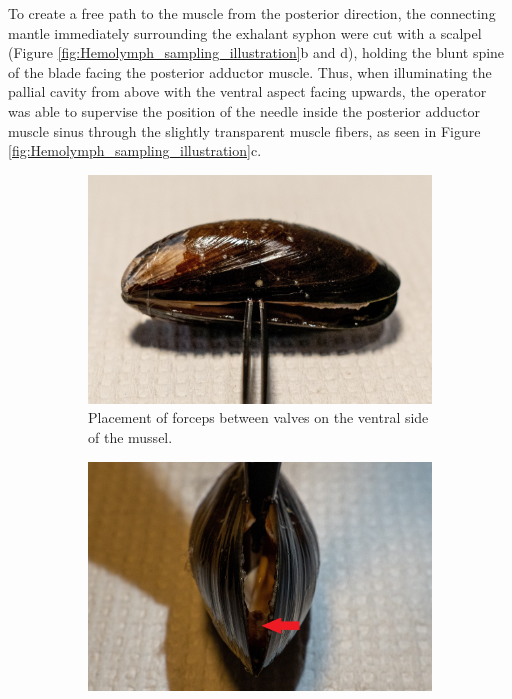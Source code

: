 To create a free path to the muscle from the posterior direction, the connecting mantle immediately surrounding the exhalant syphon were cut with a scalpel (Figure \ref{fig:Hemolymph_sampling_illustration}b and d), holding the blunt spine of the blade facing the posterior adductor muscle. Thus, when illuminating the pallial cavity from above with the ventral aspect facing upwards, the operator was able to supervise the position of the needle inside the posterior adductor muscle sinus through the slightly transparent muscle fibers, as seen in Figure \ref{fig:Hemolymph_sampling_illustration}c.

\begin{figure}[H]
    \centering
    \begin{subfigure}[b]{.45\textwidth}
        \centering
        \includegraphics[width=\textwidth]{figures/Sampling technique/forceps square color.jpg}
        \caption{Placement of forceps between valves on the ventral side of the mussel.}
        \label{sfig:a}
    \end{subfigure}
    \hfill
    \begin{subfigure}[b]{.45\textwidth}
        \centering
        \includegraphics[width=\textwidth]{figures/Sampling technique/uncut color 3495.jpg}

\end{subfigure}
\end{figure}
